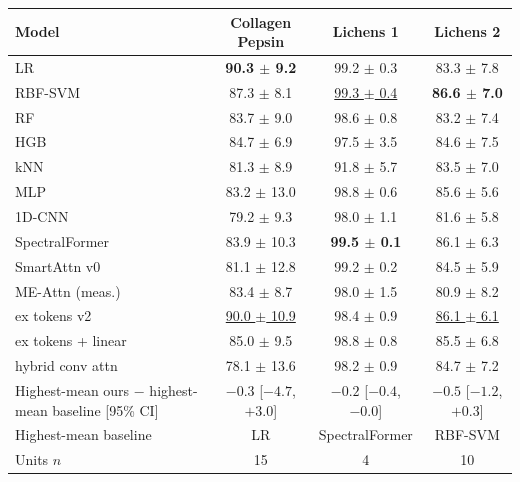 \small
\begin{tabular}{lccc}
\toprule
Model & Collagen Pepsin & Lichens 1 & Lichens 2 \\
\midrule
LR & \textbf{90.3 $\pm$ 9.2} & 99.2 $\pm$ 0.3 & 83.3 $\pm$ 7.8 \\
RBF-SVM & 87.3 $\pm$ 8.1 & \underline{99.3 $\pm$ 0.4} & \textbf{86.6 $\pm$ 7.0} \\
RF & 83.7 $\pm$ 9.0 & 98.6 $\pm$ 0.8 & 83.2 $\pm$ 7.4 \\
HGB & 84.7 $\pm$ 6.9 & 97.5 $\pm$ 3.5 & 84.6 $\pm$ 7.5 \\
kNN & 81.3 $\pm$ 8.9 & 91.8 $\pm$ 5.7 & 83.5 $\pm$ 7.0 \\
MLP & 83.2 $\pm$ 13.0 & 98.8 $\pm$ 0.6 & 85.6 $\pm$ 5.6 \\
1D-CNN & 79.2 $\pm$ 9.3 & 98.0 $\pm$ 1.1 & 81.6 $\pm$ 5.8 \\
SpectralFormer & 83.9 $\pm$ 10.3 & \textbf{99.5 $\pm$ 0.1} & 86.1 $\pm$ 6.3 \\
\midrule
SmartAttn v0 & 81.1 $\pm$ 12.8 & 99.2 $\pm$ 0.2 & 84.5 $\pm$ 5.9 \\
ME-Attn (meas.) & 83.4 $\pm$ 8.7 & 98.0 $\pm$ 1.5 & 80.9 $\pm$ 8.2 \\
ex tokens v2 & \underline{90.0 $\pm$ 10.9} & 98.4 $\pm$ 0.9 & \underline{86.1 $\pm$ 6.1} \\
ex tokens + linear & 85.0 $\pm$ 9.5 & 98.8 $\pm$ 0.8 & 85.5 $\pm$ 6.8 \\
hybrid conv attn & 78.1 $\pm$ 13.6 & 98.2 $\pm$ 0.9 & 84.7 $\pm$ 7.2 \\
\midrule
Highest-mean ours $-$ highest-mean baseline [95\% CI] & $-0.3$ [$-4.7$, $+3.0$] & $-0.2$ [$-0.4$, $-0.0$] & $-0.5$ [$-1.2$, $+0.3$] \\
Highest-mean baseline & LR & SpectralFormer & RBF-SVM \\
\midrule
Units $n$ & 15 & 4 & 10 \\
\bottomrule
\end{tabular}
